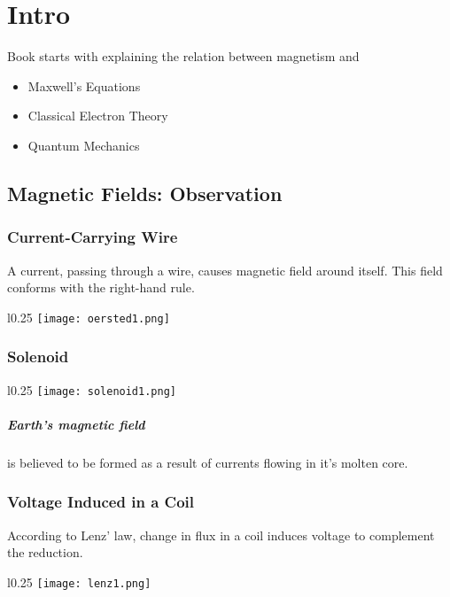 
\section{Intro}
\label{intro}

Book starts with explaining the relation between magnetism and
\begin{itemize}
	\item Maxwell's Equations
	\item Classical Electron Theory
	\item Quantum Mechanics
\end{itemize}





\subsection{Magnetic Fields: Observation}
\subsubsection{Current-Carrying Wire}

A current, passing through a wire, causes magnetic field around itself. This field conforms with the right-hand rule.


\begin{wrapfigure}{l}{0.25\textwidth}
    \centering
    \texttt{[image: oersted1.png]}
\end{wrapfigure}


\subsubsection{Solenoid}


\begin{wrapfigure}{l}{0.25\textwidth}
    \centering
    \texttt{[image: solenoid1.png]}
\end{wrapfigure}

\subparagraph{Earth's magnetic field} is believed to be formed as a result of currents flowing in it's molten core.

\subsubsection{Voltage Induced in a Coil}

According to Lenz' law, change in flux in a coil induces voltage to complement the reduction.
\begin{wrapfigure}{l}{0.25\textwidth}
    \centering
    \texttt{[image: lenz1.png]}
\end{wrapfigure}

